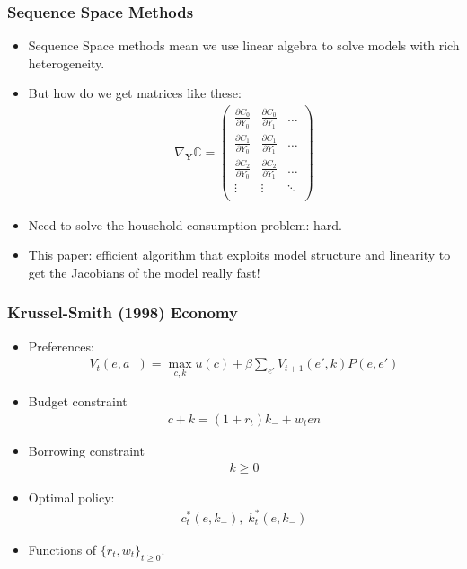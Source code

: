 \documentclass[english,xcolor=svgnames]{beamer}
\begin{document}
\begin{frame}
    \frametitle{Sequence Space Methods}
    \begin{itemize}
    	\item Sequence Space methods mean we use linear algebra to solve models with rich heterogeneity. 
        \item But how do we get matrices like these: 
        \begin{align*}
            \nabla_{\bm{Y}}\pmb{\mathbb{C}} = 
            \begin{pmatrix}
                \frac{\partial C_{0}}{\partial Y_0} & \frac{\partial C_{0}}{\partial Y_1} & \hdots \\
                \frac{\partial C_{1}}{\partial Y_0} & \frac{\partial C_{1}}{\partial Y_1} & \hdots \\
                \frac{\partial C_{2}}{\partial Y_0} & \frac{\partial C_{2}}{\partial Y_1} & \hdots \\
                \vdots & \vdots & \ddots \\
            \end{pmatrix}
        \end{align*}
        \item Need to solve the household consumption problem: hard.
        \item This paper: efficient algorithm that exploits model structure and linearity to get the Jacobians of the model really fast!
    \end{itemize}
\end{frame}




\begin{frame}
    \frametitle{Krussel-Smith (1998) Economy}
    \begin{itemize}
        \item Preferences:
        \begin{align*}
        	V_t(e,a_{-}) = \max_{c,k} u(c) + \beta \sum_{e'} V_{t+1}(e',k)P(e,e')
        \end{align*}
        \item Budget constraint
        \begin{align*}
        	c+k = (1+r_t)k_{-}+w_t e n
        \end{align*}
        \item Borrowing constraint
        \begin{align*}
        	k \ge 0
        \end{align*}
        \item Optimal policy:
        \begin{align*}
        	c_t^*(e,k_{-}),\; k_t^*(e,k_{-})
        \end{align*}
        \item Functions of $\{r_t,w_t\}_{t\ge 0 }$.
	\end{itemize}
\end{frame}
\end{document}

